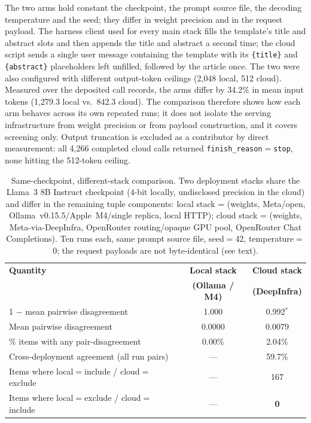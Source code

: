 \documentclass[preprint,review,12pt,authoryear]{elsarticle}
\begin{document}
The two arms hold constant the checkpoint, the prompt source file, the decoding temperature and the seed; they differ in weight precision and in the request payload. The harness client used for every main stack fills the template's title and abstract slots and then appends the title and abstract a second time; the cloud script sends a single user message containing the template with its \texttt{\{title\}} and \texttt{\{abstract\}} placeholders left unfilled, followed by the article once. The two were also configured with different output-token ceilings (2{,}048 local, 512 cloud). Measured over the deposited call records, the arms differ by 34.2\% in mean input tokens (1{,}279.3 local vs.\ 842.3 cloud). The comparison therefore shows how each arm behaves across its own repeated runs; it does not isolate the serving infrastructure from weight precision or from payload construction, and it covers screening only.
Output truncation is excluded as a contributor by direct measurement: all 4{,}266 completed cloud calls returned \texttt{finish\_reason}${=}$\texttt{stop}, none hitting the 512-token ceiling.

\begin{table}[htbp]
\centering
\caption{Same-checkpoint, different-stack comparison. Two deployment stacks share the Llama~3 8B Instruct checkpoint (4-bit locally, undisclosed precision in the cloud) and differ in the remaining tuple components: local stack = (weights, Meta/open, Ollama~v0.15.5/Apple~M4/single replica, local HTTP); cloud stack = (weights, Meta-via-DeepInfra, OpenRouter routing/opaque GPU pool, OpenRouter Chat Completions). Ten runs each, same prompt source file, seed${=}$42, temperature${=}$0; the request payloads are not byte-identical (see text).}
\label{tab:desconfound}
\small
\setlength{\tabcolsep}{5pt}
\begin{tabular}{lcc}
\toprule
\textbf{Quantity} & \textbf{Local stack} & \textbf{Cloud stack} \\
 & \textbf{(Ollama / M4)} & \textbf{(DeepInfra)} \\
\midrule
1 $-$ mean pairwise disagreement & 1.000 & 0.992$^{*}$ \\
Mean pairwise disagreement      & 0.0000 & 0.0079 \\
\% items with any pair-disagreement & 0.00\% & 2.04\% \\
Cross-deployment agreement (all run pairs) & ---  & 59.7\% \\
Items where local${=}$include / cloud${=}$exclude & --- & 167 \\
Items where local${=}$exclude / cloud${=}$include & --- & \textbf{0} \\
\bottomrule
\end{tabular}
\par{}
\end{table}
\end{document}

